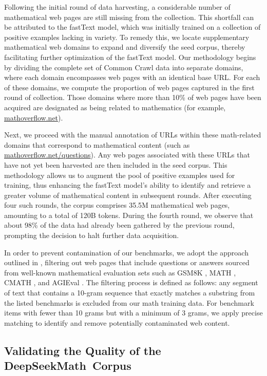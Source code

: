 \begin{itemize}[topsep=0pt]
Following the initial round of data harvesting, a considerable number of mathematical web pages are still missing from the collection. This shortfall can be attributed to the fastText model, which was initially trained on a collection of positive examples lacking in variety. To remedy this, we locate supplementary mathematical web domains to expand and diversify the seed corpus, thereby facilitating further optimization of the fastText model. Our methodology begins by dividing the complete set of Common Crawl data into separate domains, where each domain encompasses web pages with an identical base URL. For each of these domains, we compute the proportion of web pages captured in the first round of collection. Those domains where more than 10\% of web pages have been acquired are designated as being related to mathematics (for example, \url{mathoverflow.net}).

Next, we proceed with the manual annotation of URLs within these math-related domains that correspond to mathematical content (such as \url{mathoverflow.net/questions}). Any web pages associated with these URLs that have not yet been harvested are then included in the seed corpus. This methodology allows us to augment the pool of positive examples used for training, thus enhancing the fastText model’s ability to identify and retrieve a greater volume of mathematical content in subsequent rounds. After executing four such rounds, the corpus comprises 35.5M mathematical web pages, amounting to a total of 120B tokens. During the fourth round, we observe that about 98\% of the data had already been gathered by the previous round, prompting the decision to halt further data acquisition.

In order to prevent contamination of our benchmarks, we adopt the approach outlined in \cite{deepseek-coder}, filtering out web pages that include questions or answers sourced from well-known mathematical evaluation sets such as GSM8K \citep{gsm8k}, MATH \citep{MATH}, CMATH \citep{wei2023cmath}, and AGIEval \citep{agieval}. The filtering process is defined as follows: any segment of text that contains a 10-gram sequence that exactly matches a substring from the listed benchmarks is excluded from our math training data. For benchmark items with fewer than 10 grams but with a minimum of 3 grams, we apply precise matching to identify and remove potentially contaminated web content.

\subsection{Validating the Quality of the DeepSeekMath~Corpus}


\end{itemize}
